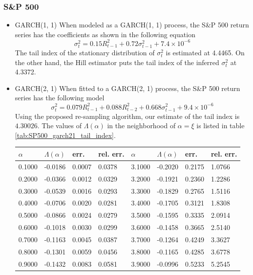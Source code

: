 \documentclass[aoas,preprint]{imsart}
\numberwithin{equation}{section}
\theoremstyle{plain}
\begin{document}
\subsubsection{S\&P 500}
\begin{itemize}
\item GARCH(1, 1)
  When modeled as a GARCH(1, 1) process, the S\&P 500 return series
  has the coefficients as shown in the following equation
  \[
  \sigma_t^2 = 0.15 R_{t-1}^2 + 0.72 \sigma_{t-1}^2 + 7.4 \times 10^{-6}
  \]
  The tail index of the stationary distribution of $\sigma_t^2$ is
  estimated at 4.4465. On the other hand, the Hill estimator puts the
  tail index of the inferred $\sigma_t^2$ at 4.3372.

\item GARCH(2, 1)
  When fitted to a GARCH(2, 1) process, the S\&P 500 return series has
  the following model
  \[
  \sigma_t^2 = 0.079 R_{t-1}^2 + 0.088 R_{t-2}^2 + 0.668 \sigma_{t-1}^2 + 9.4 \times 10^{-6}
  \]
  Using the proposed re-sampling algorithm, our estimate of the tail
  index is $4.30026$. The values of $\Lambda(\alpha)$ in the
  neighborhood of $\alpha = \xi$ is listed in table
  \ref{tab:SP500_garch21_tail_index}.
  \begin{table}[htb!]
    \centering
    \begin{tabular}{l|l|l|l||l|l|l|l}
      $\alpha$ & $\Lambda(\alpha)$ & err. & rel. err. & $\alpha$ & $\Lambda(\alpha)$ & err. & rel. err. \\
      \hline
      0.1000 & -0.0186 & 0.0007 & 0.0378 & 3.1000 & -0.2020 & 0.2175 & 1.0766\\
      0.2000 & -0.0366 & 0.0012 & 0.0329 & 3.2000 & -0.1921 & 0.2360 & 1.2286\\
      0.3000 & -0.0539 & 0.0016 & 0.0293 & 3.3000 & -0.1829 & 0.2765 & 1.5116\\
      0.4000 & -0.0706 & 0.0020 & 0.0281 & 3.4000 & -0.1705 & 0.3121 & 1.8308\\
      0.5000 & -0.0866 & 0.0024 & 0.0279 & 3.5000 & -0.1595 & 0.3335 & 2.0914\\
      0.6000 & -0.1018 & 0.0030 & 0.0299 & 3.6000 & -0.1458 & 0.3665 & 2.5140\\
      0.7000 & -0.1163 & 0.0045 & 0.0387 & 3.7000 & -0.1264 & 0.4249 & 3.3627\\
      0.8000 & -0.1301 & 0.0059 & 0.0456 & 3.8000 & -0.1165 & 0.4285 & 3.6778\\
      0.9000 & -0.1432 & 0.0083 & 0.0581 & 3.9000 & -0.0996 & 0.5233 & 5.2545\\

\end{tabular}
\end{table}
\end{itemize}
\end{document}
